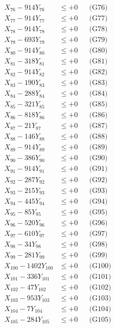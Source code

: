 \documentclass[a4paper,10pt]{article}
\begin{document}
{\begin{align}
X_{76} - 914Y_{76} &\leq +0 && \text{(G76)} \\
X_{77} - 914Y_{77} &\leq +0 && \text{(G77)} \\
X_{78} - 914Y_{78} &\leq +0 && \text{(G78)} \\
X_{79} - 693Y_{79} &\leq +0 && \text{(G79)} \\
X_{80} - 914Y_{80} &\leq +0 && \text{(G80)} \\
\allowbreak
X_{81} - 318Y_{81} &\leq +0 && \text{(G81)} \\
X_{82} - 914Y_{82} &\leq +0 && \text{(G82)} \\
X_{83} - 190Y_{83} &\leq +0 && \text{(G83)} \\
X_{84} - 288Y_{84} &\leq +0 && \text{(G84)} \\
X_{85} - 321Y_{85} &\leq +0 && \text{(G85)} \\
X_{86} - 818Y_{86} &\leq +0 && \text{(G86)} \\
X_{87} - 21Y_{87} &\leq +0 && \text{(G87)} \\
X_{88} - 146Y_{88} &\leq +0 && \text{(G88)} \\
X_{89} - 914Y_{89} &\leq +0 && \text{(G89)} \\
X_{90} - 386Y_{90} &\leq +0 && \text{(G90)} \\
\allowbreak
X_{91} - 914Y_{91} &\leq +0 && \text{(G91)} \\
X_{92} - 287Y_{92} &\leq +0 && \text{(G92)} \\
X_{93} - 215Y_{93} &\leq +0 && \text{(G93)} \\
X_{94} - 445Y_{94} &\leq +0 && \text{(G94)} \\
X_{95} - 85Y_{95} &\leq +0 && \text{(G95)} \\
X_{96} - 520Y_{96} &\leq +0 && \text{(G96)} \\
X_{97} - 610Y_{97} &\leq +0 && \text{(G97)} \\
X_{98} - 34Y_{98} &\leq +0 && \text{(G98)} \\
X_{99} - 281Y_{99} &\leq +0 && \text{(G99)} \\
X_{100} - 1402Y_{100} &\leq +0 && \text{(G100)} \\
\allowbreak
X_{101} - 336Y_{101} &\leq +0 && \text{(G101)} \\
X_{102} - 47Y_{102} &\leq +0 && \text{(G102)} \\
X_{103} - 953Y_{103} &\leq +0 && \text{(G103)} \\
X_{104} - 7Y_{104} &\leq +0 && \text{(G104)} \\
X_{105} - 284Y_{105} &\leq +0 && \text{(G105)} \\

\end{align}}
\end{document}
